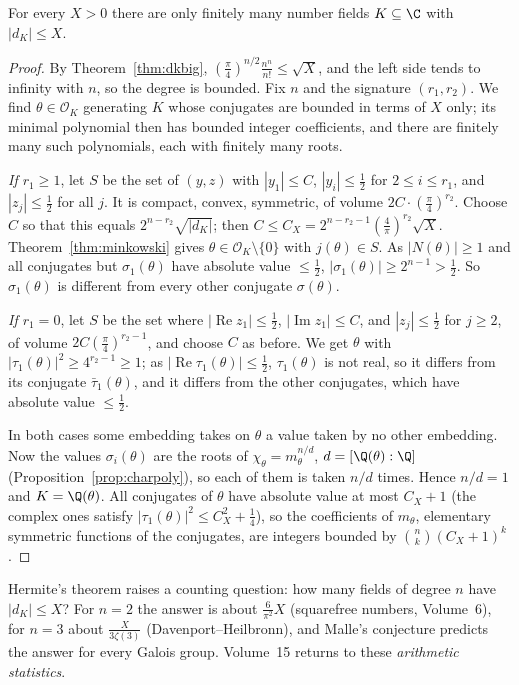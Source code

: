 \begin{theorem}[Hermite]\label{thm:hermite}
For every $X>0$ there are only finitely many number fields $K\subseteq\C$ with $|d_K|\le X$.
\end{theorem}
\begin{proof}
By Theorem~\ref{thm:dkbig}, $(\frac\pi4)^{n/2}\frac{n^n}{n!}\le\sqrt X$, and the left side tends to infinity with $n$, so
the degree is bounded. Fix $n$ and the signature $(r_1,r_2)$. We find $\theta\in\mathcal O_K$ generating $K$ whose
conjugates are bounded in terms of $X$ only; its minimal polynomial then has bounded integer coefficients, and there are
finitely many such polynomials, each with finitely many roots.

\emph{If $r_1\ge1$}, let $S$ be the set of $(y,z)$ with $|y_1|\le C$, $|y_i|\le\frac12$ for $2\le i\le r_1$, and
$|z_j|\le\frac12$ for all $j$. It is compact, convex, symmetric, of volume $2C\cdot(\frac\pi4)^{r_2}$. Choose $C$ so that
this equals $2^{n-r_2}\sqrt{|d_K|}$; then $C\le C_X=2^{n-r_2-1}(\frac4\pi)^{r_2}\sqrt X$. Theorem~\ref{thm:minkowski}
gives $\theta\in\mathcal O_K\setminus\{0\}$ with $j(\theta)\in S$. As $|N(\theta)|\ge1$ and all conjugates but
$\sigma_1(\theta)$ have absolute value $\le\frac12$, $|\sigma_1(\theta)|\ge2^{n-1}>\frac12$. So $\sigma_1(\theta)$ is
different from every other conjugate $\sigma(\theta)$.

\emph{If $r_1=0$}, let $S$ be the set where $|\operatorname{Re}z_1|\le\frac12$, $|\operatorname{Im}z_1|\le C$, and $|z_j|
\le\frac12$ for $j\ge2$, of volume $2C(\frac\pi4)^{r_2-1}$, and choose $C$ as before. We get $\theta$ with $|\tau_1(\theta)|^2
\ge4^{r_2-1}\ge1$; as $|\operatorname{Re}\tau_1(\theta)|\le\frac12$, $\tau_1(\theta)$ is not real, so it differs from
its conjugate $\bar\tau_1(\theta)$, and it differs from the other conjugates, which have absolute value $\le\frac12$.

In both cases some embedding takes on $\theta$ a value taken by no other embedding. Now the values $\sigma_i(\theta)$
are the roots of $\chi_\theta=m_\theta^{n/d}$, $d=[\Q(\theta):\Q]$ (Proposition~\ref{prop:charpoly}), so each of them is
taken $n/d$ times. Hence $n/d=1$ and $K=\Q(\theta)$. All conjugates of $\theta$
have absolute value at most $C_X+1$ (the complex ones satisfy $|\tau_1(\theta)|^2\le C_X^2+\frac14$), so the coefficients of
$m_\theta$, elementary symmetric functions of the conjugates, are integers bounded by $\binom nk(C_X+1)^k$.
\end{proof}

Hermite's theorem raises a counting question: how many fields of degree $n$ have $|d_K|\le X$? For $n=2$ the answer is
about $\frac6{\pi^2}X$ (squarefree numbers, Volume~6), for $n=3$ about $\frac X{3\zeta(3)}$ (Davenport--Heilbronn), and
Malle's conjecture predicts the answer for every Galois group. Volume~15 returns to these \emph{arithmetic statistics}.

